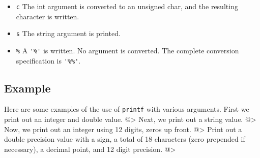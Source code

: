 \begin{itemize}
\item  \verb|c| The int argument is  converted  to  an  unsigned  char, and  the resulting character is written.

\item  \verb|s| The string argument is printed.

\item  \verb|%|   A \verb|'%'| is written. No argument is converted. The complete conversion specification is \verb|'%%'|.

\end{itemize}
\subsection{Example}

Here are some examples of the use of \verb|printf| with various arguments.  First we print out an integer and double value.
@>
Next, we print out a string value.
@>
Now, we print out an integer using 12 digits, zeros up front.
@>
Print out a double precision value with a sign, a total of 18 characters (zero prepended if necessary), a decimal point, and 12 digit precision.
@>
